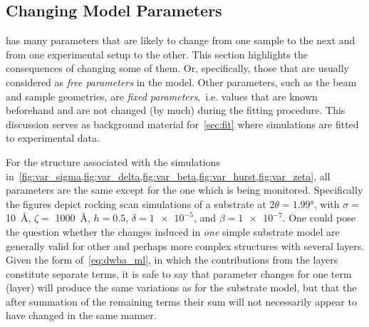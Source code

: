 \documentclass[10pt,twoside, b5paper,pdftex]{report}
\begin{document}
\subsection{Changing Model Parameters}
 has many parameters that are likely to change from one sample to the next and from one experimental setup to the other. This section highlights the consequences of changing some of them. Or, specifically, those that are usually considered as {\it free parameters} in the model. Other parameters, such as the beam and sample geometries, are {\it fixed parameters},~i.e. values that are known beforehand and are not changed (by much) during the fitting procedure. This discussion serves as background material for~\cref{sec:fit} where simulations are fitted to experimental data.

For the structure associated with the simulations in~\cref{fig:var_sigma,fig:var_delta,fig:var_beta,fig:var_hurst,fig:var_zeta}, all parameters are the same except for the one which is being monitored. Specifically the figures depict rocking scan simulations of a substrate at $2\theta = 1.99$\si{\degree}, with $\sigma = $ \SI{10}{\angstrom}, $\zeta =$ \SI{1000}{\angstrom}, $h = 0.5$, $\delta = \num{1e-5}$, and $\beta = \num{1e-7}$. One could pose the question whether the changes induced in {\it one} simple substrate model are generally valid for other and perhaps more complex structures with several layers. Given the form of~\cref{eq:dwba_ml}, in which the contributions from the layers constitute separate terms, it is safe to say that parameter changes for one term (layer) will produce the same variations as for the substrate model, but that the after summation of the remaining terms their sum will not necessarily appear to have changed in the same manner.  
\end{document}
